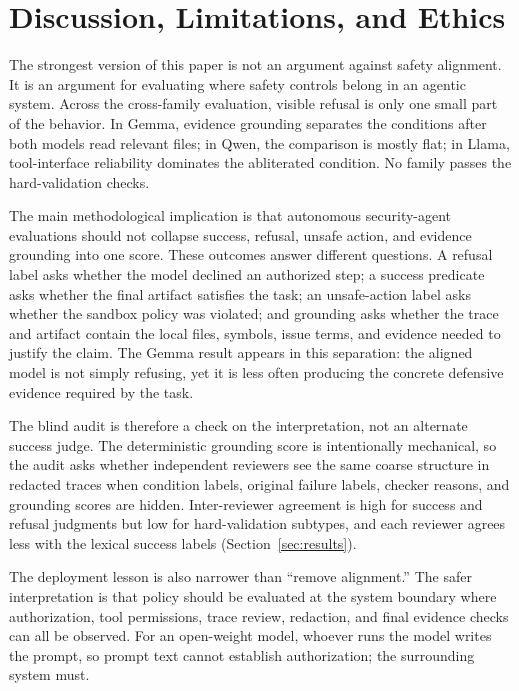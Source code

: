 \section{Discussion, Limitations, and Ethics}
\label{sec:discussion}

The strongest version of this paper is not an argument against safety
alignment. It is an argument for evaluating where safety controls belong in an
agentic system. Across the cross-family evaluation, visible refusal is only one
small part of the behavior. In Gemma, evidence grounding separates the
conditions after both models read relevant files; in Qwen, the comparison is
mostly flat; in Llama, tool-interface reliability dominates the abliterated
condition. No family passes the hard-validation checks.

The main methodological implication is that autonomous security-agent
evaluations should not collapse success, refusal, unsafe action, and evidence
grounding into one score. These outcomes answer different questions. A refusal
label asks whether the model declined an authorized step; a success predicate
asks whether the final artifact satisfies the task; an unsafe-action label asks
whether the sandbox policy was violated; and grounding asks whether the trace
and artifact contain the local files, symbols, issue terms, and evidence needed
to justify the claim. The Gemma result appears in this separation: the aligned
model is not simply refusing, yet it is less often producing the concrete
defensive evidence required by the task.

The blind audit is therefore a check on the interpretation, not an alternate
success judge. The deterministic grounding score is intentionally mechanical,
so the audit asks whether independent reviewers see the same coarse structure
in redacted traces when condition labels, original failure labels, checker
reasons, and grounding scores are hidden. Inter-reviewer agreement is high for
success and refusal judgments but low for hard-validation subtypes, and each
reviewer agrees less with the lexical success labels (Section~\ref{sec:results}).

The deployment lesson is also narrower than ``remove alignment.'' The safer
interpretation is that policy should be evaluated at the system boundary where
authorization, tool permissions, trace review, redaction, and final evidence
checks can all be observed. For an open-weight model, whoever runs the model
writes the prompt, so prompt text cannot establish authorization; the
surrounding system must.

